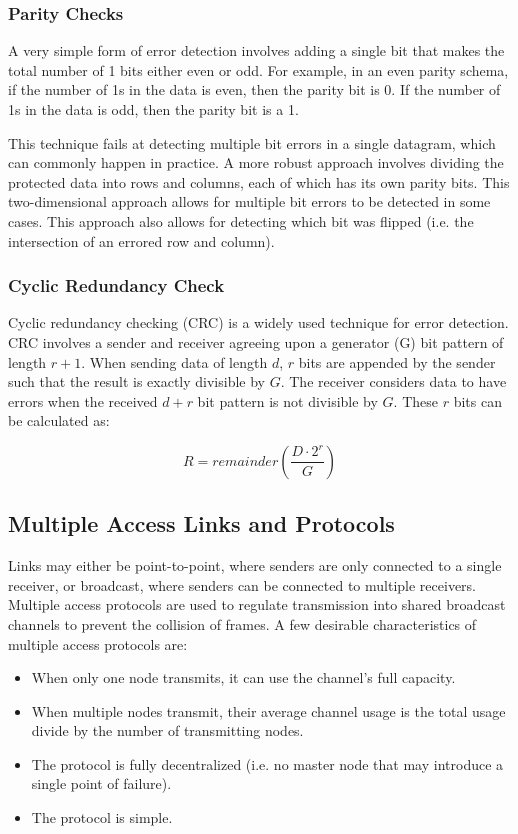 \documentclass[12pt,titlepage]{article}
\begin{document}
      \subsubsection{Parity Checks}
        A very simple form of error detection involves adding a single bit that makes the total number of 1 bits either even or odd. For example, in an even parity
        schema, if the number of 1s in the data is even, then the parity bit is 0. If the number of 1s in the data is odd, then the parity bit is a 1.

        This technique fails at detecting multiple bit errors in a single datagram, which can commonly happen in practice. A more robust approach involves dividing
        the protected data into rows and columns, each of which has its own parity bits. This two-dimensional approach allows for multiple bit errors to be
        detected in some cases. This approach also allows for detecting which bit was flipped (i.e. the intersection of an errored row and column).

      \subsubsection{Cyclic Redundancy Check}
        Cyclic redundancy checking (CRC) is a widely used technique for error detection. CRC involves a sender and receiver agreeing upon a generator (G) bit
        pattern of length $r + 1$. When sending data of length $d$, $r$ bits are appended by the sender such that the result is exactly divisible by $G$.
        The receiver considers data to have errors when the received $d + r$ bit pattern is not divisible by $G$. These $r$ bits can be calculated as:

        $$R = remainder(\frac{D \cdot 2^r}{G})$$

    \subsection{Multiple Access Links and Protocols}
      Links may either be point-to-point, where senders are only connected to a single receiver, or broadcast, where senders can be connected to multiple receivers.
      Multiple access protocols are used to regulate transmission into shared broadcast channels to prevent the collision of frames. A few desirable characteristics
      of multiple access protocols are:
      \begin{itemize}
        \item When only one node transmits, it can use the channel's full capacity.
        \item When multiple nodes transmit, their average channel usage is the total usage divide by the number of transmitting nodes.
        \item The protocol is fully decentralized (i.e. no master node that may introduce a single point of failure).
        \item The protocol is simple.
      \end{itemize}
\end{document}
